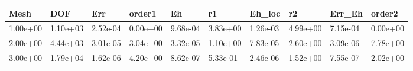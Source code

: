 \begin{tabular}{llllllllll}
Mesh & DOF & Err & order1 & Eh & r1 & Eh_loc & r2 & Err_Eh & order2 \\ 
\hline 
1.00e+00 & 1.10e+03 & 2.52e-04 & 0.00e+00 & 9.68e-04 & 3.83e+00 & 1.26e-03 & 4.99e+00 & 7.15e-04 & 0.00e+00 \\ 
2.00e+00 & 4.44e+03 & 3.01e-05 & 3.04e+00 & 3.32e-05 & 1.10e+00 & 7.83e-05 & 2.60e+00 & 3.09e-06 & 7.78e+00 \\ 
3.00e+00 & 1.79e+04 & 1.62e-06 & 4.20e+00 & 8.62e-07 & 5.33e-01 & 2.46e-06 & 1.52e+00 & 7.55e-07 & 2.02e+00 \\ 
\hline 
\end{tabular}